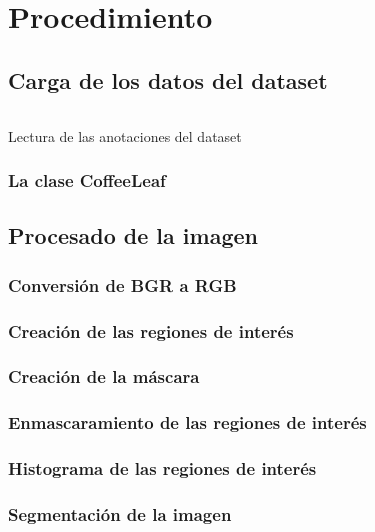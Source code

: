 \chapter{Procedimiento}

\section{Carga de los datos del dataset}

\begin{listing}[!ht]
\inputminted{python}{code_listings/load_dataset.py}
\caption{Lectura de las anotaciones del dataset}
\label{code:load_dataset}
\end{listing}

\subsection{La clase CoffeeLeaf}

\section{Procesado de la imagen}

\subsection{Conversión de BGR a RGB}

\subsection{Creación de las regiones de interés}

\subsection{Creación de la máscara}

\subsection{Enmascaramiento de las regiones de interés}

\subsection{Histograma de las regiones de interés}

\subsection{Segmentación de la imagen}

